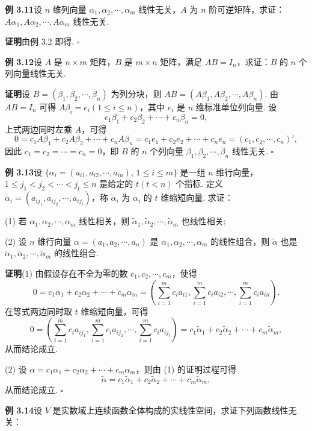 \documentclass[UTF8, 12pt, fontset=fandol, oneside]{ctexart}
\begin{document}
\noindent\textbf{例 3.11}\quad 设 $n$ 维列向量 $\alpha_1,\alpha_2,\cdots,\alpha_m$ 线性无关，$A$ 为 $n$ 阶可逆矩阵，求证：$A\alpha_1,A\alpha_2,\cdots,A\alpha_m$ 线性无关.

\noindent\textbf{证明}\quad 由例 3.2 即得. $\square$

\noindent\textbf{例 3.12}\quad 设 $A$ 是 $n\times m$ 矩阵，$B$ 是 $m\times n$ 矩阵，满足 $AB=I_n$，求证：$B$ 的 $n$ 个列向量线性无关.

\noindent\textbf{证明}\quad 设 $B=(\beta_1,\beta_2,\cdots,\beta_n)$ 为列分块，则 $AB=(A\beta_1,A\beta_2,\cdots,A\beta_n)$. 由 $AB=I_n$ 可得 $A\beta_i=e_i(1\le i\le n)$，其中 $e_i$ 是 $n$ 维标准单位列向量. 设
\[
c_1\beta_1+c_2\beta_2+\cdots+c_n\beta_n=0,
\]
上式两边同时左乘 $A$，可得
\[
0=c_1A\beta_1+c_2A\beta_2+\cdots+c_nA\beta_n=c_1e_1+c_2e_2+\cdots+c_ne_n=(c_1,c_2,\cdots,c_n)',
\]
因此 $c_1=c_2=\cdots=c_n=0$，即 $B$ 的 $n$ 个列向量 $\beta_1,\beta_2,\cdots,\beta_n$ 线性无关. $\square$

\noindent\textbf{例 3.13}\quad 设 $\{\alpha_i=(a_{i1},a_{i2},\cdots,a_{in}),\,1\le i\le m\}$ 是一组 $n$ 维行向量，$1\le j_1<j_2<\cdots<j_t\le n$ 是给定的 $t(t<n)$ 个指标. 定义 $\widetilde\alpha_i=(a_{ij_1},a_{ij_2},\cdots,a_{ij_t})$，称 $\widetilde\alpha_i$ 为 $\alpha_i$ 的 $t$ 维缩短向量. 求证：

(1) 若 $\alpha_1,\alpha_2,\cdots,\alpha_m$ 线性相关，则 $\widetilde\alpha_1,\widetilde\alpha_2,\cdots,\widetilde\alpha_m$ 也线性相关;

(2) 设 $n$ 维行向量 $\alpha=(a_1,a_2,\cdots,a_n)$ 是 $\alpha_1,\alpha_2,\cdots,\alpha_m$ 的线性组合，则 $\widetilde\alpha$ 也是 $\widetilde\alpha_1,\widetilde\alpha_2,\cdots,\widetilde\alpha_m$ 的线性组合.

\noindent\textbf{证明}\quad (1) 由假设存在不全为零的数 $c_1,c_2,\cdots,c_m$，使得
\[
0=c_1\alpha_1+c_2\alpha_2+\cdots+c_m\alpha_m=
\left(\sum_{i=1}^m c_i a_{i1},\sum_{i=1}^m c_i a_{i2},\cdots,\sum_{i=1}^m c_i a_{in}\right).
\]
在等式两边同时取 $t$ 维缩短向量，可得
\[
0=\left(\sum_{i=1}^m c_i a_{ij_1},\sum_{i=1}^m c_i a_{ij_2},\cdots,\sum_{i=1}^m c_i a_{ij_t}\right)
=c_1\widetilde\alpha_1+c_2\widetilde\alpha_2+\cdots+c_m\widetilde\alpha_m,
\]
从而结论成立.

(2) 设 $\alpha=c_1\alpha_1+c_2\alpha_2+\cdots+c_m\alpha_m$，则由 (1) 的证明过程可得
\[
\widetilde\alpha=c_1\widetilde\alpha_1+c_2\widetilde\alpha_2+\cdots+c_m\widetilde\alpha_m,
\]
从而结论成立. $\square$

\noindent\textbf{例 3.14}\quad 设 $V$ 是实数域上连续函数全体构成的实线性空间，求证下列函数线性无关：
\end{document}
